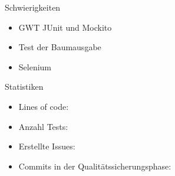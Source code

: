 \documentclass[10pt]{beamer}
\begin{document}
\begin{frame}{Schwierigkeiten}
\begin{itemize}
	\setlength{\itemsep}{10pt}
	\item GWT JUnit und Mockito 
	\item Test der Baumausgabe
	\item Selenium
\end{itemize}
\end{frame}

\begin{frame}{Statistiken} %
\begin{itemize}
\item Lines of code:
\item Anzahl Tests:
\item Erstellte Issues:
\item Commits in der Qualitätssicherungsphase:
\end{itemize}
\end{frame}
\end{document}
